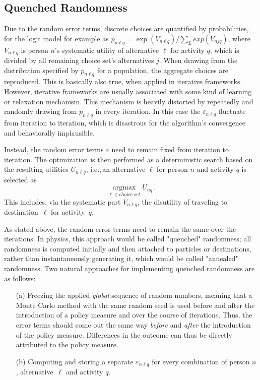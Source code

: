 \subsection{Quenched Randomness}
Due to the random error terms, discrete choices are quantified by probabilities, for the logit model for example as $p_{n\ell q} = \exp(V_{n\ell q}) / \sum_L exp(V_{njq})$, where $V_{n\ell q}$ is person $n$'s systematic utility of alternative $\ell$ for activity $q$, which is divided by all remaining choice set's alternatives $j$. When drawing from the distribution specified by $p_{n\ell q}$ for a population, the aggregate choices are reproduced. This is basically also true, when applied in iterative frameworks. However, iterative frameworks are usually associated with some kind of learning or relaxation mechanism. This mechanism is heavily distorted by repeatedly and randomly drawing from $p_{n\ell q}$ in every iteration. In this case the $\varepsilon_{n\ell q}$ fluctuate from iteration to iteration, which is disastrous for the algorithm's convergence and behaviorally implausible.

Instead, the random error terms $\varepsilon$ need to remain fixed from iteration to iteration. The optimization is then performed as a deterministic search based on the resulting utilities $U_{n\ell q}$, i.e.,\,an alternative $\ell$ for person $n$ and activity $q$ is selected as 
\[ 
\underset{\ell \in choice\: set}{\operatorname{argmax}} U_{nq} \,.
\] 
This includes, via the systematic part $V_{n\ell q}$, the disutility of traveling to destination~$\ell$ for activity~$q$.

As stated above, the random error terms need to remain the same over the iterations. In physics, this approach would be called "quenched" randomness; all randomness is computed initially and then attached to particles or destinations, rather than instantaneously generating it, which would be called "annealed" randomness. Two natural approaches for implementing quenched randomness are as follows:
\begin{itemize}
\item[(a)] Freezing the applied \emph{global} sequence of random numbers, meaning that a Monte Carlo method with the same random seed is used before and after the introduction of a policy measure and over the course of iterations. Thus, the error terms should come out the same way \emph{before} and \emph{after} the introduction of the policy measure. Differences in the outcome can thus be directly attributed to the policy measure. 
\item[(b)] Computing and storing a separate $\varepsilon_{n\ell q}$ for every combination of person $n$, alternative~$\ell$ and activity $q$.
\end{itemize}
 
